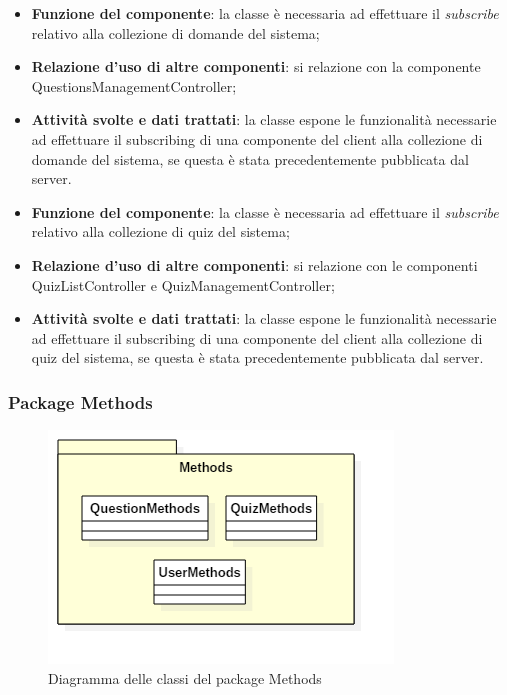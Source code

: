 \begin{itemize}
	\item\textbf{Funzione del componente}: la classe è necessaria ad effettuare il \emph{subscribe} relativo alla collezione di domande del sistema;
	\item\textbf{Relazione d'uso di altre componenti}: si relazione con la componente QuestionsManagementController;
	\item\textbf{Attività svolte e dati trattati}: la classe espone le funzionalità necessarie ad effettuare il subscribing di una componente del client alla collezione di domande del sistema, se questa è stata precedentemente pubblicata dal server.
\end{itemize}


\begin{itemize}
	\item\textbf{Funzione del componente}: la classe è necessaria ad effettuare il \emph{subscribe} relativo alla collezione di quiz del sistema;
	\item\textbf{Relazione d'uso di altre componenti}: si relazione con le componenti QuizListController e QuizManagementController;
	\item\textbf{Attività svolte e dati trattati}: la classe espone le funzionalità necessarie ad effettuare il subscribing di una componente del client alla collezione di quiz del sistema, se questa è stata precedentemente pubblicata dal server.
\end{itemize}

\subsubsection{Package Methods}
\begin{figure}[h!]
\begin{center}
	\includegraphics[scale=0.65]{../images/MethodsClass.png}
	\caption{Diagramma delle classi del package Methods}
\end{center}
\end{figure}

